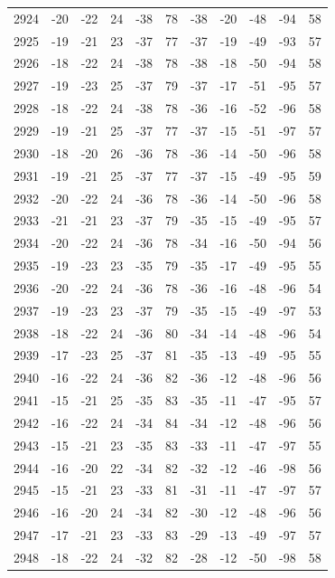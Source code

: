 \begin{table}[H]
\begin{tabular}{lllllllllll}
2924 & -20 & -22 & 24 & -38 & 78 & -38 & -20 & -48 & -94 & 58 \\
2925 & -19 & -21 & 23 & -37 & 77 & -37 & -19 & -49 & -93 & 57 \\
2926 & -18 & -22 & 24 & -38 & 78 & -38 & -18 & -50 & -94 & 58 \\
2927 & -19 & -23 & 25 & -37 & 79 & -37 & -17 & -51 & -95 & 57 \\
2928 & -18 & -22 & 24 & -38 & 78 & -36 & -16 & -52 & -96 & 58 \\
2929 & -19 & -21 & 25 & -37 & 77 & -37 & -15 & -51 & -97 & 57 \\
2930 & -18 & -20 & 26 & -36 & 78 & -36 & -14 & -50 & -96 & 58 \\
2931 & -19 & -21 & 25 & -37 & 77 & -37 & -15 & -49 & -95 & 59 \\
2932 & -20 & -22 & 24 & -36 & 78 & -36 & -14 & -50 & -96 & 58 \\
2933 & -21 & -21 & 23 & -37 & 79 & -35 & -15 & -49 & -95 & 57 \\
2934 & -20 & -22 & 24 & -36 & 78 & -34 & -16 & -50 & -94 & 56 \\
2935 & -19 & -23 & 23 & -35 & 79 & -35 & -17 & -49 & -95 & 55 \\
2936 & -20 & -22 & 24 & -36 & 78 & -36 & -16 & -48 & -96 & 54 \\
2937 & -19 & -23 & 23 & -37 & 79 & -35 & -15 & -49 & -97 & 53 \\
2938 & -18 & -22 & 24 & -36 & 80 & -34 & -14 & -48 & -96 & 54 \\
2939 & -17 & -23 & 25 & -37 & 81 & -35 & -13 & -49 & -95 & 55 \\
2940 & -16 & -22 & 24 & -36 & 82 & -36 & -12 & -48 & -96 & 56 \\
2941 & -15 & -21 & 25 & -35 & 83 & -35 & -11 & -47 & -95 & 57 \\
2942 & -16 & -22 & 24 & -34 & 84 & -34 & -12 & -48 & -96 & 56 \\
2943 & -15 & -21 & 23 & -35 & 83 & -33 & -11 & -47 & -97 & 55 \\
2944 & -16 & -20 & 22 & -34 & 82 & -32 & -12 & -46 & -98 & 56 \\
2945 & -15 & -21 & 23 & -33 & 81 & -31 & -11 & -47 & -97 & 57 \\
2946 & -16 & -20 & 24 & -34 & 82 & -30 & -12 & -48 & -96 & 56 \\
2947 & -17 & -21 & 23 & -33 & 83 & -29 & -13 & -49 & -97 & 57 \\
2948 & -18 & -22 & 24 & -32 & 82 & -28 & -12 & -50 & -98 & 58 \\

\end{tabular}
\end{table}
